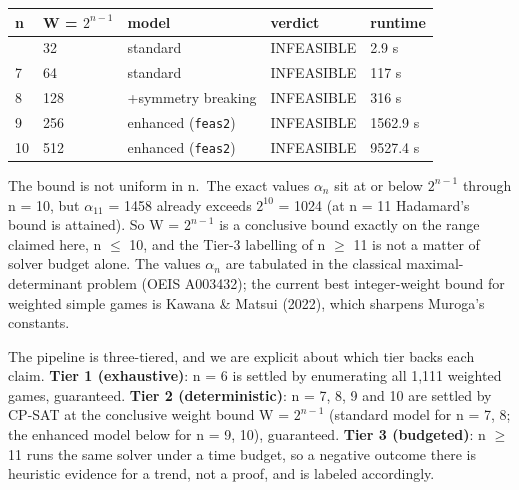 \documentclass[
]{article}
\newcounter{none} %
\begin{document}
{\def\LTcaptype{none} %
\begin{longtable}[]{@{}lllll@{}}
\toprule\noalign{}
n & W = \(2^{n-1}\) & model & verdict & runtime \\
\midrule\noalign{}
\endhead
\bottomrule\noalign{}
\endlastfoot
6 & 32 & standard & INFEASIBLE & 2.9 s \\
7 & 64 & standard & INFEASIBLE & 117 s \\
8 & 128 & +symmetry breaking & INFEASIBLE & 316 s \\
9 & 256 & enhanced (\texttt{feas2}) & INFEASIBLE & 1562.9 s \\
10 & 512 & enhanced (\texttt{feas2}) & INFEASIBLE & 9527.4 s \\
\end{longtable}
}

The bound is not uniform in n.~The exact values \(\alpha_n\) sit at or
below \(2^{n-1}\) through n = 10, but \(\alpha_{11}\) = 1458 already
exceeds \(2^10\) = 1024 (at n = 11 Hadamard's bound is attained). So W =
\(2^{n-1}\) is a conclusive bound exactly on the range claimed here, n
\(\le\) 10, and the Tier-3 labelling of n \(\ge\) 11 is not a matter of
solver budget alone. The values \(\alpha_n\) are tabulated in the
classical maximal-determinant problem (OEIS A003432); the current best
integer-weight bound for weighted simple games is Kawana \& Matsui
(2022), which sharpens Muroga's constants.

The pipeline is three-tiered, and we are explicit about which tier backs
each claim. \textbf{Tier 1 (exhaustive)}: n = 6 is settled by
enumerating all 1,111 weighted games, guaranteed. \textbf{Tier 2
(deterministic)}: n = 7, 8, 9 and 10 are settled by CP-SAT at the
conclusive weight bound W = \(2^{n-1}\) (standard model for n = 7, 8;
the enhanced model below for n = 9, 10), guaranteed. \textbf{Tier 3
(budgeted)}: n \(\ge\) 11 runs the same solver under a time budget, so a
negative outcome there is heuristic evidence for a trend, not a proof,
and is labeled accordingly.
\end{document}
